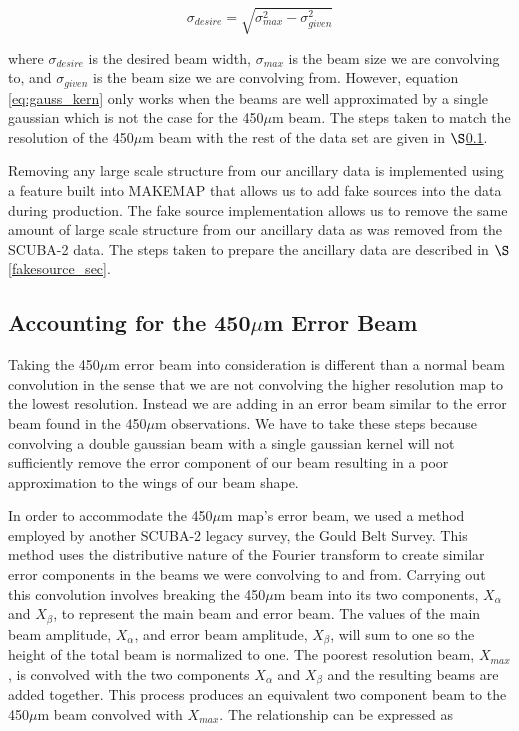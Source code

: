 \begin{equation}\label{eq:gaus_kern}
  \sigma_{desire} = \sqrt{\sigma_{max}^2 - \sigma_{given}^2}
\end{equation}

\noindent where $\sigma_{desire}$ is the desired beam width, $\sigma_{max}$ is the beam size we are convolving to, and $\sigma_{given}$ is the beam size we are convolving from.  However, equation \ref{eq:gauss_kern} only works when the beams are well approximated by a single gaussian which is not the case for the 450$\mu$m beam.  The steps taken to match the resolution of the 450$\mu$m beam with the rest of the data set are given in $\S$\ref{450_fix_sec}.  

Removing any large scale structure from our ancillary data is implemented using a feature built into MAKEMAP that allows us to add fake sources into the data during production.  The fake source implementation allows us to remove the same amount of large scale structure from our ancillary data as was removed from the SCUBA-2 data.  The steps taken to prepare the ancillary data are described in $\S$\ref{fakesource_sec}.


\subsection{Accounting for the 450$\mu$m Error Beam}\label{450_fix_sec}

Taking the 450$\mu$m error beam into consideration is different than a normal beam convolution in the sense that we are not convolving the higher resolution map to the lowest resolution.  Instead we are adding in an error beam similar to the error beam found in the 450$\mu$m observations.  We have to take these steps because convolving a double gaussian beam with a single gaussian kernel will not sufficiently remove the error component of our beam resulting in a poor approximation to the wings of our beam shape.

In order to accommodate the 450$\mu$m map's error beam, we used a method employed by another SCUBA-2 legacy survey, the Gould Belt Survey.  This method uses the distributive nature of the Fourier transform to create similar error components in the beams we were convolving to and from.  Carrying out this convolution involves breaking the 450$\mu$m beam into its two components, $X_{\alpha}$ and $X_{\beta}$, to represent the main beam and error beam.  The values of the main beam amplitude, $X_\alpha$, and error beam amplitude, $X_\beta$, will sum to one so the height of the total beam is normalized to one.  The poorest resolution beam, $X_{max}$, is convolved with the two components $X_\alpha$ and $X_\beta$ and the resulting beams are added together.  This process produces an equivalent two component beam to the 450$\mu$m beam convolved with $X_{max}$.  The relationship can be expressed as 

